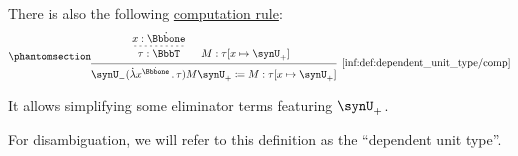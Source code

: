 \begin{definition}
  There is also the following \hyperref[rem:type_theory_rule_classification/equality/comp]{computation rule}:
  \begin{equation*}\taglabel[\ensuremath{ \Bbbone_\beta }]{inf:def:dependent_unit_type/comp}
    \begin{prooftree}
      \hypo{ x: \syn\Bbbone }
      \infer[dashed]1{ \tau: \BbbT }

      \hypo{ M: \tau[x \mapsto \synU_+] }

      \infer2[\ref{inf:def:dependent_unit_type/comp}]{ \synU_- (\qabs {x^{\syn\Bbbone}} \tau) M \synU_+ \coloneqq M: \tau[x \mapsto \synU_+] }
    \end{prooftree}
  \end{equation*}

  It allows simplifying some eliminator terms featuring \( \synU_+ \).
\end{definition}
\begin{comments}
  \item For disambiguation, we will refer to this definition as the \enquote{dependent unit type}.
\end{comments}

